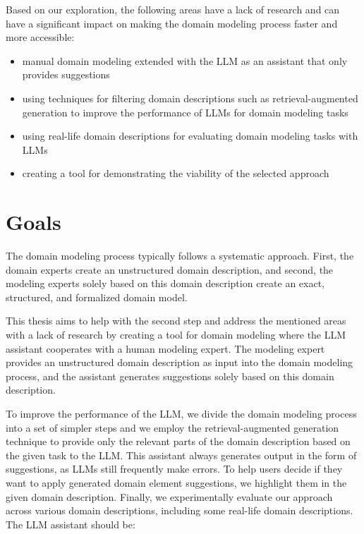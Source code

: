 Based on our exploration, the following areas have a lack of research and can have a significant impact on making the domain modeling process faster and more accessible:

\begin{itemize}
\item manual domain modeling extended with the LLM as an assistant that only provides suggestions
\item using techniques for filtering domain descriptions such as retrieval-augmented generation to improve the performance of LLMs for domain modeling tasks
\item using real-life domain descriptions for evaluating domain modeling tasks with LLMs
\item creating a tool for demonstrating the viability of the selected approach
\end{itemize}


\section*{Goals}

The domain modeling process typically follows a systematic approach. First, the domain experts create an unstructured domain description, and second, the modeling experts solely based on this domain description create an exact, structured, and formalized domain model.

This thesis aims to help with the second step and address the mentioned areas with a lack of research by creating a tool for domain modeling where the LLM assistant cooperates with a human modeling expert. The modeling expert provides an unstructured domain description as input into the domain modeling process, and the assistant generates suggestions solely based on this domain description.

To improve the performance of the LLM, we divide the domain modeling process into a set of simpler steps and we employ the retrieval-augmented generation technique to provide only the relevant parts of the domain description based on the given task to the LLM. This assistant always generates output in the form of suggestions, as LLMs still frequently make errors. To help users decide if they want to apply generated domain element suggestions, we highlight them in the given domain description. Finally, we experimentally evaluate our approach across various domain descriptions, including some real-life domain descriptions. The LLM assistant should be:

